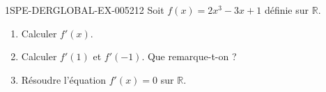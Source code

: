 \begin{exercice}{1SPE-DERGLOBAL-EX-005}{2}{12}
Soit $f(x) = 2x^3 - 3x + 1$ définie sur $\mathbb{R}$.
\begin{enumerate}
  \item Calculer $f'(x)$.
  \item Calculer $f'(1)$ et $f'(-1)$. Que remarque-t-on ?
  \item Résoudre l'équation $f'(x) = 0$ sur $\mathbb{R}$.
\end{enumerate}
\end{exercice}
